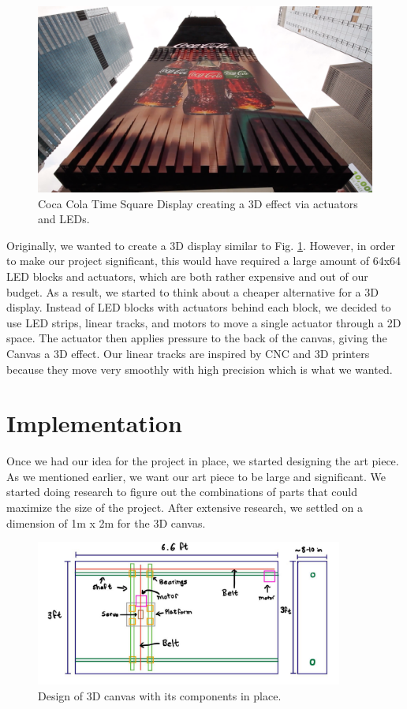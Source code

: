 \documentclass[12pt]{article}
\begin{document}
\begin{figure}[H]
  \centering
  \includegraphics[width=1\textwidth]{image1.png}
  \caption{Coca Cola Time Square Display creating a 3D effect via actuators and LEDs.}
  \label{fig:cocacola}
\end{figure}

Originally, we wanted to create a 3D display similar to Fig. \ref{fig:cocacola}. However, in order to make our project significant, this would have required a large amount of 64x64 LED blocks and actuators, which are both rather expensive and out of our budget. As a result, we started to think about a cheaper alternative for a 3D display. Instead of LED blocks with actuators behind each block, we decided to use LED strips, linear tracks, and motors to move a single actuator through a 2D space. The actuator then applies pressure to the back of the canvas, giving the Canvas a 3D effect. Our linear tracks are inspired by CNC and 3D printers because they move very smoothly with high precision which is what we wanted.

\section{Implementation}
Once we had our idea for the project in place, we started designing the art piece. As we mentioned earlier, we want our art piece to be large and significant. We started doing research to figure out the combinations of parts that could maximize the size of the project. After extensive research, we settled on a dimension of 1m x 2m for the 3D canvas.

\begin{figure}[H]
  \centering
  \includegraphics[width=0.9\textwidth]{image4.png}
  \caption{Design of 3D canvas with its components in place.}
  \label{fig:design}
\end{figure}
\end{document}
